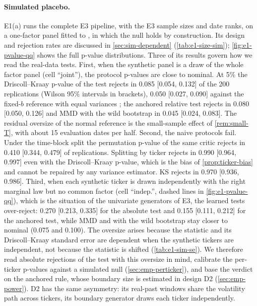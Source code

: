 \paragraph{Simulated placebo.}
E1(a) runs the complete E3 pipeline, with the E3 sample sizes and date ranks, on a one-factor
\GARCHt{} panel fitted to \TRAIN{}, in which the null holds by construction. Its design and
rejection rates are discussed in \cref{sec:sim-dependent} (\cref{tab:e1-size-sim});
\cref{fig:e1-pvalue-qq} shows the full p-value distributions. Three of its results govern how
we read the real-data tests. First, when the synthetic panel is a draw of the whole factor panel
(cell ``joint''), the protocol p-values are close to nominal. At 5\% the Driscoll--Kraay p-value
of the \WC{} test rejects in 0.085 [0.054, 0.132] of the 200 replications (Wilson 95\% intervals
in brackets), 0.050 [0.027, 0.090] against the fixed-$b$ reference with equal variances
\citep{kiefer_2005_new}; the anchored relative test rejects in 0.080 [0.050, 0.126] and MMD with
the wild bootstrap in 0.045 [0.024, 0.083]. The residual oversize of the normal reference is the
small-sample effect of \cref{rem:small-T}, with about 15 evaluation dates per half. Second, the
naive protocols fail. Under the time-block split the permutation p-value of the same critic
rejects in 0.410 [0.344, 0.479] of replications. Splitting by ticker rejects in 0.990
[0.964, 0.997] even with the Driscoll--Kraay p-value, which is the bias of
\cref{prop:ticker-bias} and cannot be repaired by any variance estimator. KS rejects in 0.970
[0.936, 0.986]. Third, when each synthetic ticker is drawn independently with the right
marginal law but no common factor (cell ``indep.'', dashed lines in \cref{fig:e1-pvalue-qq}),
which is the situation of the univariate generators of E3, the learned tests over-reject: 0.270
[0.213, 0.335] for the absolute \WC{} test and 0.155 [0.111, 0.212] for the anchored test, while
MMD and \SigMMD{} with the wild bootstrap stay closer to nominal (0.075 and 0.100). The oversize
arises because the statistic and its Driscoll--Kraay standard error are dependent when the
synthetic tickers are independent, not because the statistic is shifted (\cref{tab:e1-sim-se}).
We therefore
read absolute rejections of the \WC{} test with this oversize in mind, calibrate the per-ticker
p-values against a simulated null (\cref{sec:emp-perticker}), and base the verdict on the
anchored rule, whose boundary size is estimated in design D2 (\cref{sec:emp-power}). D2 has the
same asymmetry: its real-past windows share the \TRAIN{} volatility path across tickers, its
boundary generator draws each ticker independently.

